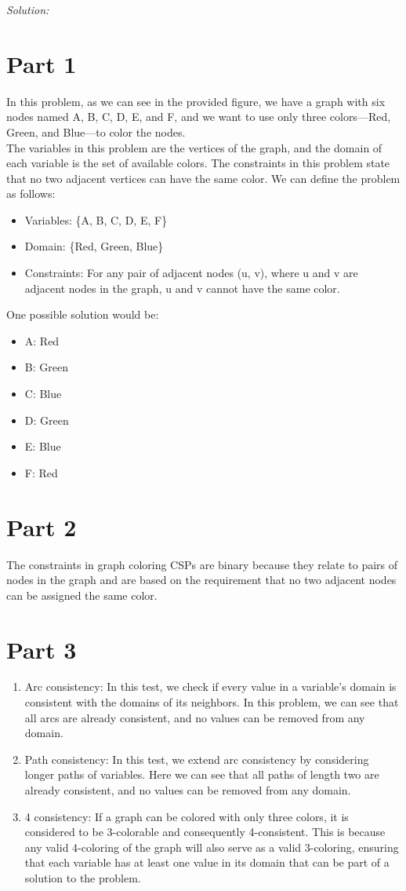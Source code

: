 \documentclass[a4paper, 11pt]{article}
\newenvironment{solution}
    {\textit{Solution:}}
    {}
\begin{document}
{\begin{solution}
\section*{\small Part 1}
In this problem, as we can see in the provided figure, we have a graph with six nodes named A, B, C, D, E, and F, and we want to use only three colors—Red, Green, and Blue—to color the nodes.\\
The variables in this problem are the vertices of the graph, and the domain of each variable is the set of available colors. The constraints in this problem state that no two adjacent vertices can have the same color. We can define the problem as follows:
\begin{itemize}
	\item Variables: \{A, B, C, D, E, F\}
	\item Domain: \{Red, Green, Blue\}	
	\item Constraints: For any pair of adjacent nodes (u, v), where u and v are adjacent nodes in the graph, u and v cannot have the same color.
\end{itemize}
One possible solution would be:
\begin{itemize}
	\item A: Red
	\item B: Green
	\item C: Blue
	\item D: Green
	\item E: Blue
	\item F: Red
\end{itemize}
\section*{\small Part 2}
The constraints in graph coloring CSPs are binary because they relate to pairs of nodes in the graph and are based on the requirement that no two adjacent nodes can be assigned the same color.
\section*{\small Part 3}
\begin{enumerate}
	\item Arc consistency: In this test, we check if every value in a variable's domain is consistent with the domains of its neighbors. In this problem, we can see that all arcs are already consistent, and no values can be removed from any domain.
	\item Path consistency: In this test, we extend arc consistency by considering longer paths of variables. Here we can see that all paths of length two are already consistent, and no values can be removed from any domain.
	\item 4 consistency: If a graph can be colored with only three colors, it is considered to be 3-colorable and consequently 4-consistent. This is because any valid 4-coloring of the graph will also serve as a valid 3-coloring, ensuring that each variable has at least one value in its domain that can be part of a solution to the problem.
\end{enumerate}

\end{solution}}
\end{document}
